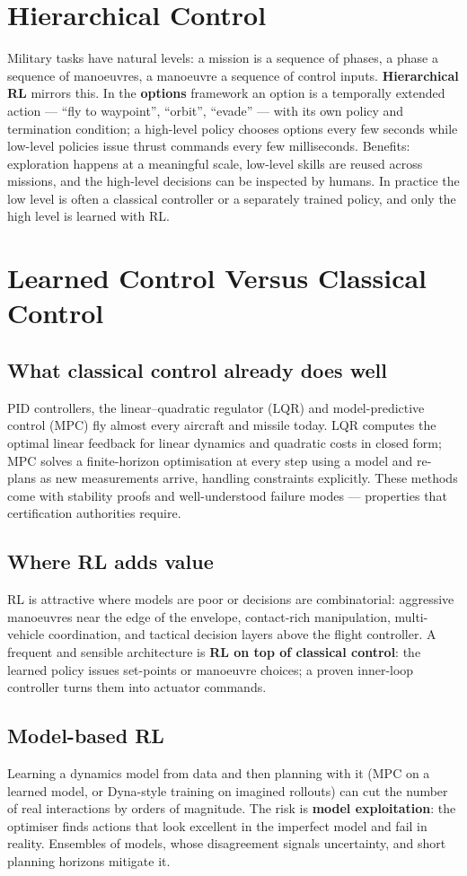 \documentclass[11pt]{article}
\begin{document}
\section{Hierarchical Control}
Military tasks have natural levels: a mission is a sequence of phases, a phase a sequence of manoeuvres, a manoeuvre a sequence of control inputs. \textbf{Hierarchical RL} mirrors this. In the \textbf{options} framework an option is a temporally extended action --- ``fly to waypoint'', ``orbit'', ``evade'' --- with its own policy and termination condition; a high-level policy chooses options every few seconds while low-level policies issue thrust commands every few milliseconds. Benefits: exploration happens at a meaningful scale, low-level skills are reused across missions, and the high-level decisions can be inspected by humans. In practice the low level is often a classical controller or a separately trained policy, and only the high level is learned with RL.

\section{Learned Control Versus Classical Control}
\subsection{What classical control already does well}
PID controllers, the linear--quadratic regulator (LQR) and model-predictive control (MPC) fly almost every aircraft and missile today. LQR computes the optimal linear feedback for linear dynamics and quadratic costs in closed form; MPC solves a finite-horizon optimisation at every step using a model and re-plans as new measurements arrive, handling constraints explicitly. These methods come with stability proofs and well-understood failure modes --- properties that certification authorities require.
\subsection{Where RL adds value}
RL is attractive where models are poor or decisions are combinatorial: aggressive manoeuvres near the edge of the envelope, contact-rich manipulation, multi-vehicle coordination, and tactical decision layers above the flight controller. A frequent and sensible architecture is \textbf{RL on top of classical control}: the learned policy issues set-points or manoeuvre choices; a proven inner-loop controller turns them into actuator commands.
\subsection{Model-based RL}
Learning a dynamics model from data and then planning with it (MPC on a learned model, or Dyna-style training on imagined rollouts) can cut the number of real interactions by orders of magnitude. The risk is \textbf{model exploitation}: the optimiser finds actions that look excellent in the imperfect model and fail in reality. Ensembles of models, whose disagreement signals uncertainty, and short planning horizons mitigate it.
\end{document}
